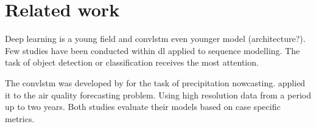 

\section{Related work} \label{sec:related_work}
Deep learning is a young field and \acrshort{convlstm} even younger model (architecture?). Few studies have been conducted within \acrshort{dl} applied to sequence modelling. The task of object detection or classification receives the most attention.

The \acrshort{convlstm} was developed by  for the task of precipitation nowcasting.  applied it to the air quality forecasting problem. Using high resolution data from a period up to two years. Both studies evaluate their models based on case specific metrics. %

